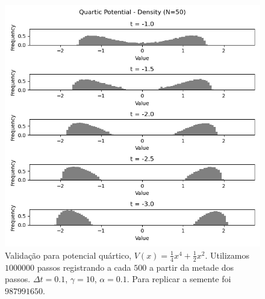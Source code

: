 \documentclass[12pt]{report}
\begin{document}
\begin{center}
	\begin{figure}
		\includegraphics[scale=0.8]{Assets/validationArticleQuartic}
		\caption{Validação para potencial quártico, $V(x) = \frac{1}{4} x^4 + \frac{1}{2} x^2$. Utilizamos $1000000$ passos registrando a cada $500$ a partir da metade dos passos. $\Delta t = 0.1$, $\gamma = 10$, $\alpha = 0.1$. Para replicar a semente foi $987991650$.}
	\end{figure}
\end{center}
\end{document}
